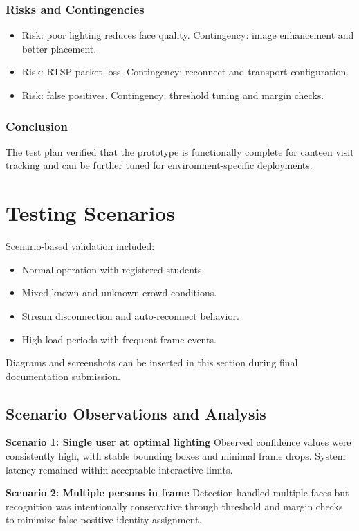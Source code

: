 \documentclass{fisatprojectfinal}
\begin{document}
\subsubsection*{Risks and Contingencies}
\begin{itemize}
	\item Risk: poor lighting reduces face quality. Contingency: image enhancement and better placement.
	\item Risk: RTSP packet loss. Contingency: reconnect and transport configuration.
	\item Risk: false positives. Contingency: threshold tuning and margin checks.
\end{itemize}

\subsubsection*{Conclusion}
The test plan verified that the prototype is functionally complete for canteen visit tracking and can be further tuned for environment-specific deployments.

\section{Testing Scenarios}
Scenario-based validation included:
\begin{itemize}
	\item Normal operation with registered students.
	\item Mixed known and unknown crowd conditions.
	\item Stream disconnection and auto-reconnect behavior.
	\item High-load periods with frequent frame events.
\end{itemize}
Diagrams and screenshots can be inserted in this section during final documentation submission.

\subsection*{Scenario Observations and Analysis}
\textbf{Scenario 1: Single user at optimal lighting}\newline
Observed confidence values were consistently high, with stable bounding boxes and minimal frame drops. System latency remained within acceptable interactive limits.

\textbf{Scenario 2: Multiple persons in frame}\newline
Detection handled multiple faces but recognition was intentionally conservative through threshold and margin checks to minimize false-positive identity assignment.
\end{document}
